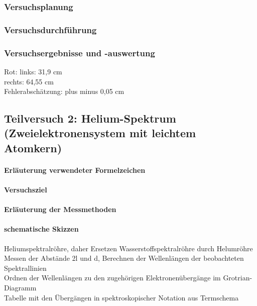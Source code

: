 \documentclass[12pt,oneside,oldfontcommands]{memoir}
\begin{document}
\subsubsection{Versuchsplanung}
\subsubsection{Versuchsdurchführung}
\subsubsection{Versuchsergebnisse und -auswertung}
Rot: links: 31,9 cm\\
rechts: 64,55 cm\\

Fehlerabschätzung: plus minus 0,05 cm\\




\subsection{Teilversuch 2: Helium-Spektrum (Zweielektronensystem mit leichtem Atomkern)}
\paragraph{Erläuterung verwendeter Formelzeichen}
\paragraph{Versuchsziel}
\paragraph{Erläuterung der Messmethoden}
\paragraph{schematische Skizzen}

Heliumspektralröhre, daher Ersetzen Wasserstoffspektralröhre durch Helumröhre\\

Messen der Abstände 2l und d, Berechnen der Wellenlängen der beobachteten Spektrallinien\\

Ordnen der Wellenlängen zu den zugehörigen Elektronenübergänge im Grotrian-Diagramm\\

Tabelle mit den Übergängen in spektroskopischer Notation aus Termschema\\
\end{document}
